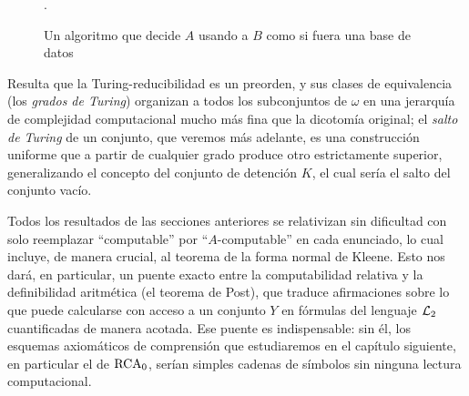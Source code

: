 \begin{figure}[h!]
	\centering
	\caption[Cómputo relativo a un oráculo]{Un algoritmo que decide $A$ usando a $B$ como si fuera una base de datos}
	\label{fig:oraculo_base_datos}.
\end{figure}

Resulta que la Turing-reducibilidad es un preorden, y sus clases de equivalencia (los \emph{grados de Turing}) organizan a todos los subconjuntos de $\omega$ en una jerarquía de complejidad computacional mucho más fina que la dicotomía original; el \emph{salto de Turing} de un conjunto, que veremos más adelante, es una construcción uniforme que a partir de cualquier grado produce otro estrictamente superior, generalizando el concepto del conjunto de detención $K$, el cual sería el salto del conjunto vacío.

Todos los resultados de las secciones anteriores se relativizan sin dificultad con solo reemplazar ``computable'' por ``$A$-computable'' en cada enunciado, lo cual incluye, de manera crucial, al teorema de la forma normal de Kleene. Esto nos dará, en particular, un puente exacto entre la computabilidad relativa y la definibilidad aritmética (el teorema de Post), que traduce afirmaciones sobre lo que puede calcularse con acceso a un conjunto $Y$ en fórmulas del lenguaje 
$\mathcal{L}_{2}$ cuantificadas de manera acotada. Ese puente es indispensable: sin él, los esquemas axiomáticos de comprensión que estudiaremos en el capítulo siguiente, en particular el de 
$\mathrm{RCA}_{0}$, serían simples cadenas de símbolos sin ninguna lectura computacional.

